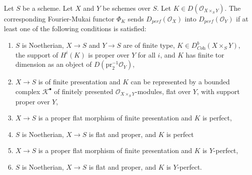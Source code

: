 \begin{lemma}
\label{lemma-fourier-mukai}
Let $S$ be a scheme. Let $X$ and $Y$ be schemes over $S$.
Let $K \in D(\mathcal{O}_{X \times_S Y})$.
The corresponding Fourier-Mukai functor $\Phi_K$ sends
$D_{perf}(\mathcal{O}_X)$ into $D_{perf}(\mathcal{O}_Y)$ if at least
one of the following conditions is satisfied:
\begin{enumerate}
\item $S$ is Noetherian, $X \to S$ and $Y \to S$ are of finite type,
$K \in D^b_{\textit{Coh}}(X \times_S Y)$, the support of $H^i(K)$
is proper over $Y$ for all $i$, and $K$ has finite tor dimension
as an object of $D(\text{pr}_2^{-1}\mathcal{O}_Y)$,
\item $X \to S$ is of finite presentation and $K$ can be represented
by a bounded complex $\mathcal{K}^\bullet$ of finitely presented
$\mathcal{O}_{X \times_S Y}$-modules, flat over $Y$, with support
proper over $Y$,
\item $X \to S$ is a proper flat morphism of finite presentation
and $K$ is perfect,
\item $S$ is Noetherian, $X \to S$ is flat and proper, and $K$ is perfect
\item $X \to S$ is a proper flat morphism of finite presentation
and $K$ is $Y$-perfect,
\item $S$ is Noetherian, $X \to S$ is flat and proper, and $K$ is
$Y$-perfect.
\end{enumerate}
\end{lemma}

